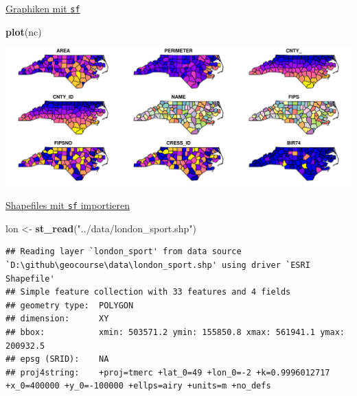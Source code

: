 \documentclass[ignorenonframetext,]{beamer}
\newenvironment{Shaded}{\begin{snugshade}}{\end{snugshade}}
\newcommand{\KeywordTok}[1]{\textcolor[rgb]{0.13,0.29,0.53}{\textbf{#1}}}
\newcommand{\NormalTok}[1]{#1}
\newcommand{\StringTok}[1]{\textcolor[rgb]{0.31,0.60,0.02}{#1}}
\begin{document}
\begin{frame}[fragile]{\href{https://r-spatial.github.io/sf/articles/sf5.html}{Graphiken
mit \texttt{sf}}}
\protect\hypertarget{graphiken-mit-sf}{}

\begin{Shaded}
\begin{Highlighting}[]
\KeywordTok{plot}\NormalTok{(nc)}
\end{Highlighting}
\end{Shaded}

\includegraphics{simplefeatures_files/figure-beamer/unnamed-chunk-14-1.pdf}

\end{frame}

\begin{frame}[fragile]{\href{https://cran.r-project.org/web/packages/sf/vignettes/sf2.html}{Shapefiles
mit \texttt{sf} importieren}}
\protect\hypertarget{shapefiles-mit-sf-importieren}{}

\begin{Shaded}
\begin{Highlighting}[]
\NormalTok{lon <-}\StringTok{ }\KeywordTok{st_read}\NormalTok{(}\StringTok{"../data/london_sport.shp"}\NormalTok{)}
\end{Highlighting}
\end{Shaded}

\begin{verbatim}
## Reading layer `london_sport' from data source `D:\github\geocourse\data\london_sport.shp' using driver `ESRI Shapefile'
## Simple feature collection with 33 features and 4 fields
## geometry type:  POLYGON
## dimension:      XY
## bbox:           xmin: 503571.2 ymin: 155850.8 xmax: 561941.1 ymax: 200932.5
## epsg (SRID):    NA
## proj4string:    +proj=tmerc +lat_0=49 +lon_0=-2 +k=0.9996012717 +x_0=400000 +y_0=-100000 +ellps=airy +units=m +no_defs
\end{verbatim}

\end{frame}
\end{document}
